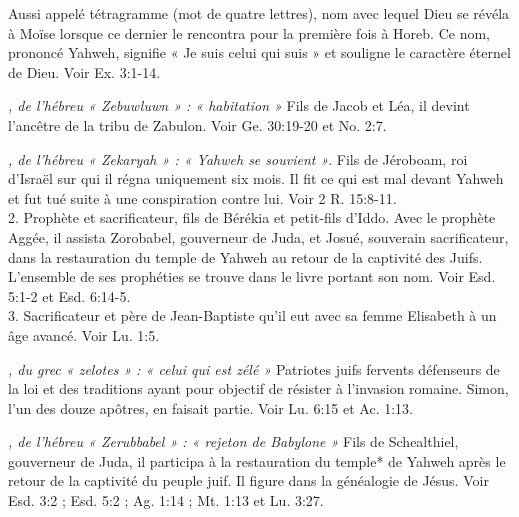 \begin{multicols}{2}
\textit{}\newline
Aussi appelé tétragramme (mot de quatre lettres), nom avec lequel Dieu se révéla à Moïse lorsque ce dernier le rencontra pour la première fois à Horeb. Ce nom, prononcé Yahweh, signifie « Je suis celui qui suis » et souligne le caractère éternel de Dieu. Voir Ex. 3:1-14.

\textit{, de l'hébreu « Zebuwluwn » : « habitation »}\newline
Fils de Jacob et Léa, il devint l'ancêtre de la tribu de Zabulon. Voir Ge. 30:19-20 et No. 2:7.

\textit{, de l'hébreu « Zekaryah » : « Yahweh se souvient »}. Fils de Jéroboam, roi d'Israël sur qui il régna uniquement six mois. Il fit ce qui est mal devant Yahweh et fut tué suite à une conspiration contre lui. Voir 2 R. 15:8-11.
\\2. Prophète et sacrificateur, fils de Bérékia et petit-fils d'Iddo. Avec le prophète Aggée, il assista Zorobabel, gouverneur de Juda, et Josué, souverain sacrificateur, dans la restauration du temple de Yahweh au retour de la captivité des Juifs. L'ensemble de ses prophéties se trouve dans le livre portant son nom. Voir Esd. 5:1-2 et Esd. 6:14-5.
\\3. Sacrificateur et père de Jean-Baptiste qu'il eut avec sa femme Elisabeth à un âge avancé. Voir Lu. 1:5.

\textit{, du grec « zelotes » : « celui qui est zélé »}\newline
Patriotes juifs fervents défenseurs de la loi et des traditions ayant pour objectif de résister à l'invasion romaine. Simon, l'un des douze apôtres, en faisait partie. Voir Lu. 6:15 et Ac. 1:13.

\textit{, de l'hébreu « Zerubbabel » : « rejeton de Babylone »}\newline
Fils de Schealthiel, gouverneur de Juda, il participa à la restauration du temple* de Yahweh après le retour de la captivité du peuple juif. Il figure dans la généalogie de Jésus. Voir Esd. 3:2 ; Esd. 5:2 ; Ag. 1:14 ; Mt. 1:13 et Lu. 3:27.

\end{multicols}

